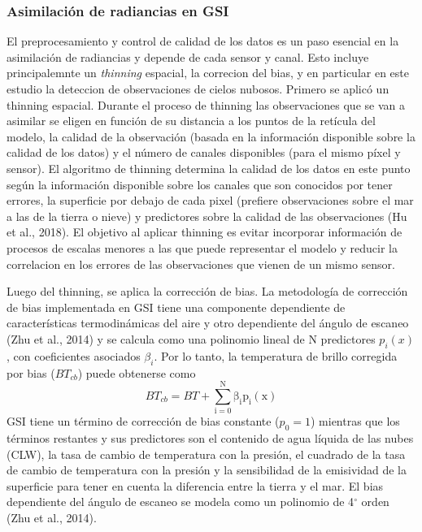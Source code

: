 \documentclass[12pt,oneside,a4paper]{reedthesis}
\begin{document}
\hypertarget{sat}{%
\subsubsection{Asimilación de radiancias en GSI}\label{sat}}

El preprocesamiento y control de calidad de los datos es un paso esencial en la asimilación de radiancias y depende de cada sensor y canal. Esto incluye principalemnte un \emph{thinning} espacial, la correcion del bias, y en particular en este estudio la deteccion de observaciones de cielos nubosos. Primero se aplicó un thinning espacial. Durante el proceso de thinning las observaciones que se van a asimilar se eligen en función de su distancia a los puntos de la retícula del modelo, la calidad de la observación (basada en la información disponible sobre la calidad de los datos) y el número de canales disponibles (para el mismo píxel y sensor). El algoritmo de thinning determina la calidad de los datos en este punto según la información disponible sobre los canales que son conocidos por tener errores, la superficie por debajo de cada pixel (prefiere observaciones sobre el mar a las de la tierra o nieve) y predictores sobre la calidad de las observaciones (Hu et al., 2018). El objetivo al aplicar thinning es evitar incorporar información de procesos de escalas menores a las que puede representar el modelo y reducir la correlacion en los errores de las observaciones que vienen de un mismo sensor.

Luego del thinning, se aplica la corrección de bias. La metodología de corrección de bias implementada en GSI tiene una componente dependiente de características termodinámicas del aire y otro dependiente del ángulo de escaneo (Zhu et al., 2014) y se calcula como una polinomio lineal de N predictores \(p_i(x)\), con coeficientes asociados \(\beta_i\). Por lo tanto, la temperatura de brillo corregida por bias (\(BT_{cb}\)) puede obtenerse como
\begin{equation}
\mathrm{\mathit{BT_{cb}} =\mathit{ BT} + \sum_{i = 0}^{N} \beta_i p_i (x)}
\label{eq:eq12}
\end{equation}
GSI tiene un término de corrección de bias constante (\(p_0 = 1\)) mientras que los términos restantes y sus predictores son el contenido de agua líquida de las nubes (CLW), la tasa de cambio de temperatura con la presión, el cuadrado de la tasa de cambio de temperatura con la presión y la sensibilidad de la emisividad de la superficie para tener en cuenta la diferencia entre la tierra y el mar. El bias dependiente del ángulo de escaneo se modela como un polinomio de 4\(^\circ\) orden (Zhu et al., 2014).
\end{document}
